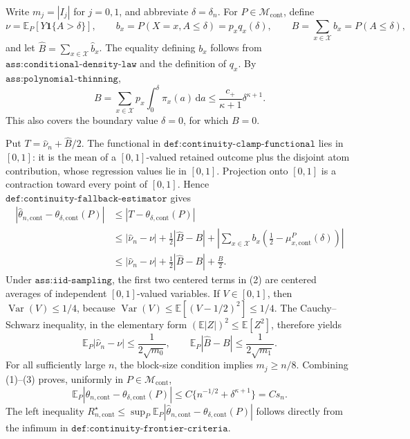 Write \(m_j=|I_j|\) for \(j=0,1\), and abbreviate \(\delta=\delta_n\).  For \(P\in\mathcal M_{\mathrm{cont}}\), define
\[
 \nu=\mathbb E_P[Y\mathbf 1\{A>\delta\}],\qquad
 b_x=P(X=x,A\leq\delta)=p_xq_x(\delta),\qquad
 B=\sum_{x\in\mathcal X}b_x=P(A\leq\delta),
\]
and let \(\widehat B=\sum_{x\in\mathcal X}\widehat b_x\).  The equality defining \(b_x\) follows from \(\texttt{ass:conditional-density-law}\) and the definition of \(q_x\).  By \(\texttt{ass:polynomial-thinning}\),
\[
 B=\sum_{x\in\mathcal X}p_x\int_0^\delta\pi_x(a)\,\mathrm da
 \leq \frac{c_+}{\kappa+1}\delta^{\kappa+1}. \tag{1}
\]
This also covers the boundary value \(\delta=0\), for which \(B=0\).

Put \(T=\widehat\nu_n+\widehat B/2\).  The functional in \(\texttt{def:continuity-clamp-functional}\) lies in \([0,1]\): it is the mean of a \([0,1]\)-valued retained outcome plus the disjoint atom contribution, whose regression values lie in \([0,1]\).  Projection onto \([0,1]\) is a contraction toward every point of \([0,1]\).  Hence \(\texttt{def:continuity-fallback-estimator}\) gives
\[
\begin{aligned}
 |\widehat\theta_{n,\mathrm{cont}}-\theta_{\delta,\mathrm{cont}}(P)|
 &\leq |T-\theta_{\delta,\mathrm{cont}}(P)|\\
 &\leq |\widehat\nu_n-\nu|+\frac12|\widehat B-B|
   +\left|\sum_{x\in\mathcal X}b_x
       \left(\frac12-\mu_{x,\mathrm{cont}}^P(\delta)\right)\right|\\
 &\leq |\widehat\nu_n-\nu|+\frac12|\widehat B-B|+\frac B2.
\end{aligned}\tag{2}
\]
Under \(\texttt{ass:iid-sampling}\), the first two centered terms in (2) are centered averages of independent \([0,1]\)-valued variables.  If \(V\in[0,1]\), then \(\operatorname{Var}(V)\leq1/4\), because \(\operatorname{Var}(V)\leq\mathbb E[(V-1/2)^2]\leq1/4\).  The Cauchy--Schwarz inequality, in the elementary form \((\mathbb E|Z|)^2\leq\mathbb E[Z^2]\), therefore yields
\[
 \mathbb E_P|\widehat\nu_n-\nu|\leq\frac1{2\sqrt{m_0}},
 \qquad
 \mathbb E_P|\widehat B-B|\leq\frac1{2\sqrt{m_1}}. \tag{3}
\]
For all sufficiently large \(n\), the block-size condition implies \(m_j\geq n/8\).  Combining (1)--(3) proves, uniformly in \(P\in\mathcal M_{\mathrm{cont}}\),
\[
 \mathbb E_P|\widehat\theta_{n,\mathrm{cont}}-
       \theta_{\delta,
       \mathrm{cont}}(P)|
 \leq C\{n^{-1/2}+\delta^{\kappa+1}\}=Cs_n. \tag{4}
\]
The left inequality \(R_{n,\mathrm{cont}}^\star\leq
\sup_P\mathbb E_P|\widehat\theta_{n,\mathrm{cont}}-
\theta_{\delta,\mathrm{cont}}(P)|\) follows directly from the infimum in \(\texttt{def:continuity-frontier-criteria}\).


